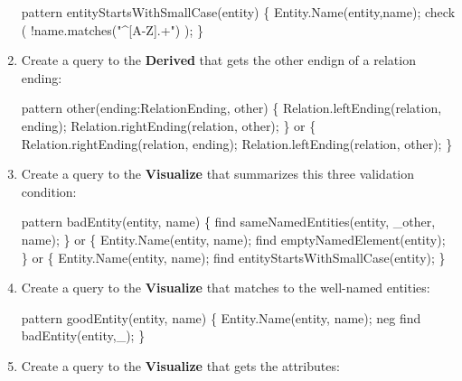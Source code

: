 \documentclass[]{report}
\newenvironment{Shaded}{}{}
\newcommand{\StringTok}[1]{\textcolor[rgb]{0.25,0.44,0.63}{{#1}}}
\newcommand{\FunctionTok}[1]{\textcolor[rgb]{0.02,0.16,0.49}{{#1}}}
\newcommand{\NormalTok}[1]{{#1}}
\begin{document}
\begin{enumerate}
\begin{Shaded}
\begin{Highlighting}[]
\NormalTok{pattern }\FunctionTok{entityStartsWithSmallCase}\NormalTok{(entity) \{}
    \NormalTok{Entity.}\FunctionTok{Name}\NormalTok{(entity,name);}
    \FunctionTok{check} \NormalTok{(}
        \NormalTok{!name.}\FunctionTok{matches}\NormalTok{(}\StringTok{"^[A-Z].+"}\NormalTok{)}
    \NormalTok{);}
\NormalTok{\}}
\end{Highlighting}
\end{Shaded}
\item
  Create a query to the \textbf{Derived} that gets the other endign of a
  relation ending:

\begin{Shaded}
\begin{Highlighting}[]
\NormalTok{pattern }\FunctionTok{other}\NormalTok{(ending:RelationEnding, other) \{}
    \NormalTok{Relation.}\FunctionTok{leftEnding}\NormalTok{(relation, ending);}
    \NormalTok{Relation.}\FunctionTok{rightEnding}\NormalTok{(relation, other);}
\NormalTok{\} or \{}
    \NormalTok{Relation.}\FunctionTok{rightEnding}\NormalTok{(relation, ending);}
    \NormalTok{Relation.}\FunctionTok{leftEnding}\NormalTok{(relation, other);}
\NormalTok{\}}
\end{Highlighting}
\end{Shaded}
\item
  Create a query to the \textbf{Visualize} that summarizes this three
  validation condition:

\begin{Shaded}
\begin{Highlighting}[]
\NormalTok{pattern }\FunctionTok{badEntity}\NormalTok{(entity, name) \{}
    \NormalTok{find }\FunctionTok{sameNamedEntities}\NormalTok{(entity, _other, name);}
\NormalTok{\} or \{}
    \NormalTok{Entity.}\FunctionTok{Name}\NormalTok{(entity, name);}
    \NormalTok{find }\FunctionTok{emptyNamedElement}\NormalTok{(entity);}
\NormalTok{\} or \{}
    \NormalTok{Entity.}\FunctionTok{Name}\NormalTok{(entity, name);}
    \NormalTok{find }\FunctionTok{entityStartsWithSmallCase}\NormalTok{(entity);}
\NormalTok{\}}
\end{Highlighting}
\end{Shaded}
\item
  Create a query to the \textbf{Visualize} that matches to the
  well-named entities:

\begin{Shaded}
\begin{Highlighting}[]
\NormalTok{pattern }\FunctionTok{goodEntity}\NormalTok{(entity, name) \{}
    \NormalTok{Entity.}\FunctionTok{Name}\NormalTok{(entity, name);}
    \NormalTok{neg find }\FunctionTok{badEntity}\NormalTok{(entity,_);}
\NormalTok{\}}
\end{Highlighting}
\end{Shaded}
\item
  Create a query to the \textbf{Visualize} that gets the attributes:


\end{enumerate}
\end{document}

